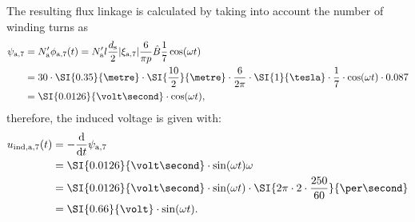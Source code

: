\begin{solutionblock}
    The resulting flux linkage is calculated by taking into account the number of winding turns as
    \begin{align}
        \begin{split}
            \psi_{\mathrm{a,}7} & = N_{\mathrm{a}}' \phi_{\mathrm{a,}7}(t)
            = N_{\mathrm{a}}' l \frac{d_{\mathrm{s}}}{2} |\xi_{\mathrm{a},7}| \frac{6}{\pi p} \hat{B} \frac{1}{7} \cos(\omega t)                                                            \\
                                & = 30 \cdot \SI{0.35}{\metre} \cdot \SI{\frac{10}{2}}{\metre} \cdot \frac{6}{2\pi} \cdot \SI{1}{\tesla} \cdot \frac{1}{7} \cdot \cos(\omega t) \cdot 0.087 \\
                                & = \SI{0.0126}{\volt\second} \cdot \cos(\omega t),
        \end{split}
    \end{align}
    therefore, the induced voltage is given with:
    \begin{align}
        \begin{split}
            u_{\mathrm{ind,a,}7}(t) & = -\frac{\mathrm{d}}{\mathrm{d}t}\psi_{\mathrm{a,}7}                                                     \\
                                    & = \SI{0.0126}{\volt\second} \cdot \sin(\omega t) \omega                                                  \\
                                    & = \SI{0.0126}{\volt\second} \cdot \sin(\omega t) \cdot \SI{2\pi\cdot 2\cdot \frac{250}{60}}{\per\second} \\
                                    & = \SI{0.66}{\volt} \cdot \sin(\omega t).
        \end{split}
    \end{align}

\end{solutionblock}





